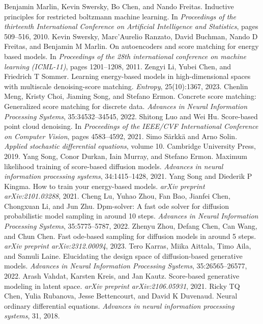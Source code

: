 \begin{chapterreferences}
 Benjamin Marlin, Kevin Swersky, Bo Chen, and Nando Freitas. Inductive principles for restricted boltzmann machine learning. In \emph{Proceedings of the thirteenth International Conference on Artificial Intelligence and Statistics}, pages 509–516, 2010.
 Kevin Swersky, Marc’Aurelio Ranzato, David Buchman, Nando D Freitas, and Benjamin M Marlin. On autoencoders and score matching for energy based models. In \emph{Proceedings of the 28th international conference on machine learning (ICML-11)}, pages 1201–1208, 2011.
 Zengyi Li, Yubei Chen, and Friedrich T Sommer. Learning energy-based models in high-dimensional spaces with multiscale denoising-score matching. \emph{Entropy}, 25(10):1367, 2023.
 Chenlin Meng, Kristy Choi, Jiaming Song, and Stefano Ermon. Concrete score matching: Generalized score matching for discrete data. \emph{Advances in Neural Information Processing Systems}, 35:34532–34545, 2022.
 Shitong Luo and Wei Hu. Score-based point cloud denoising. In \emph{Proceedings of the IEEE/CVF International Conference on Computer Vision}, pages 4583–4592, 2021.
 Simo Särkkä and Arno Solin. \emph{Applied stochastic differential equations}, volume 10. Cambridge University Press, 2019.
 Yang Song, Conor Durkan, Iain Murray, and Stefano Ermon. Maximum likelihood training of score-based diffusion models. \emph{Advances in neural information processing systems}, 34:1415–1428, 2021.
 Yang Song and Diederik P Kingma. How to train your energy-based models. \emph{arXiv preprint arXiv:2101.03288}, 2021.
 Cheng Lu, Yuhao Zhou, Fan Bao, Jianfei Chen, Chongxuan Li, and Jun Zhu. Dpm-solver: A fast ode solver for diffusion probabilistic model sampling in around 10 steps. \emph{Advances in Neural Information Processing Systems}, 35:5775–5787, 2022.
 Zhenyu Zhou, Defang Chen, Can Wang, and Chun Chen. Fast ode-based sampling for diffusion models in around 5 steps. \emph{arXiv preprint arXiv:2312.00094}, 2023.
 Tero Karras, Miika Aittala, Timo Aila, and Samuli Laine. Elucidating the design space of diffusion-based generative models. \emph{Advances in Neural Information Processing Systems}, 35:26565–26577, 2022.
 Arash Vahdat, Karsten Kreis, and Jan Kautz. Score-based generative modeling in latent space. \emph{arXiv preprint arXiv:2106.05931}, 2021.
 Ricky TQ Chen, Yulia Rubanova, Jesse Bettencourt, and David K Duvenaud. Neural ordinary differential equations. \emph{Advances in neural information processing systems}, 31, 2018.

\end{chapterreferences}
